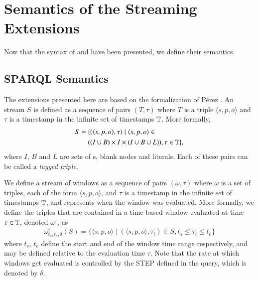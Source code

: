 \section{Semantics of the Streaming Extensions}
\label{semanticsstreaming}

Now that the syntax of \sparqlstr and \stwoo have been presented, we define their semantics.

\subsection{SPARQL Semantics}
\label{sparqlstrsemantics}

The \sparql extensions presented here are based on the formalization of %
P\'erez \etal \cite{Perez_09}.
An \rdf stream $S$ is defined as a sequence of pairs $(T,\tau)$ where $T$ is a triple  $\langle s,p,o \rangle$ and $\tau$ is a timestamp in the infinite set of timestamps $\mathbb{T}$.
More formally, 
\begin{align*}
S =\;& \{( \langle s,p,o \rangle, \tau) \mid \langle s,p,o \rangle \in \\
     & ((I \cup B) \times I \times (I \cup B \cup L)  ), \tau \in \mathbb{T}\},
\end{align*}
where $I$, $B$ and $L$ are sets of \iri \!\!s, blank nodes and literals. 
Each of these pairs can be called a \emph{tagged triple}.

We define a stream of windows as a sequence of pairs $(\omega, \tau)$ where $\omega$ is a set of triples, each of the form $\langle s, p, o \rangle$, and $\tau$ is a timestamp in the infinite set of timestamps $\mathbb{T}$, and represents when the window was evaluated.
More formally, we define the triples that are contained in a time-based window evaluated at time $\tau \in \mathbb{T}$, denoted $\omega^{\tau}$, as
\begin{align*}
  \omega^{\tau}_{t_{s},t_{e},\delta}(S)=\{ \langle s,p,o \rangle \mid (\langle s,p,o \rangle, \tau_i) \in S, t_{s} \leq \tau_i \leq t_{e}\}
\end{align*}
where $t_s$, $t_e$ define the start and end of the window time range respectively, and may be defined relative to the evaluation time $\tau$. 
Note that the rate at which windows get evaluated is controlled by the \textsf{\small{STEP}} defined in the query, which is denoted by $\delta$.%

